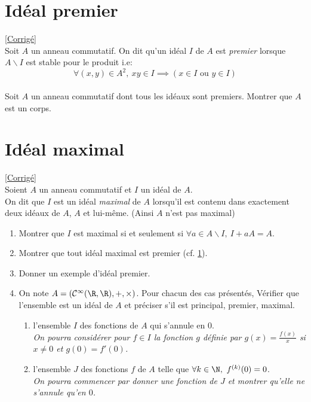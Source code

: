\documentclass[8pt]{book}
\begin{document}
	\section{Idéal premier }
	\label{Idéal premier}
	\textcolor{blue}{\hyperref[Idéal premier corrigé]{[Corrigé]}}\\
	Soit $A$ un anneau commutatif. On dit qu'un idéal $I$ de $A$ est \textit{premier} lorsque $A\backslash I$ est stable pour le produit i.e:
	$$\forall (x,y)\in A^2,\ xy\in I \implies (x\in I \text{ ou } y\in I)$$\\
	Soit $A$ un anneau commutatif dont tous les idéaux sont premiers. Montrer que $A$ est un corps.
	
	\section{Idéal maximal }
	\label{Idéal maximal}
	\textcolor{blue}{\hyperref[Idéal maximal corrigé]{[Corrigé]}}\\
	Soient $A$ un anneau commutatif et $I$ un idéal de $A$.\\
	On dit que $I$ est un idéal \textit{maximal} de $A$ lorsqu'il est contenu dans exactement deux idéaux de $A$, $A$ et lui-même. (Ainsi $A$ n'est pas maximal)
	\begin{enumerate}
		\item Montrer que $I$ est maximal si et seulement si $\forall a\in A\backslash I,\ I+aA=A$.
		\item Montrer que tout idéal maximal est premier (cf. \ref{Idéal premier}).
		\item Donner un exemple d'idéal premier.
		\item On note $A=(\mathcal C^{\infty}(\R,\R),+,\times)$. Pour chacun des cas présentés, Vérifier que l'ensemble est un idéal de $A$ et préciser s'il est principal, premier, maximal.
		\begin{enumerate}[label=\alph*.]
			\item l'ensemble $I$ des fonctions de $A$ qui s'annule en $0$.\\
			\textit{On pourra considérer pour $f\in I$ la fonction $g$ définie par $g(x)=\displaystyle\frac{f(x)}{x}$ si $x\ne 0$ et $g(0)=f'(0)$.}
			\item l'ensemble $J$ des fonctions $f$ de $A$ telle que $\forall k\in \N,\ f^{(k)}(0)=0$.\\
			\textit{On pourra commencer par donner une fonction de $J$ et montrer qu'elle ne s'annule qu'en $0$.}
		\end{enumerate}
	\end{enumerate}
	
\end{document}

